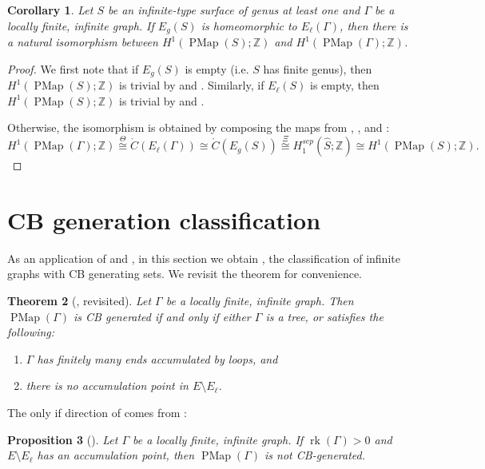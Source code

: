 \documentclass[11pt]{amsart}
\theoremstyle{plain}
\newtheorem{THM}{Theorem}[section]
\newtheorem{PROP}[THM]{Proposition}
\newtheorem{COR}[THM]{Corollary}
\theoremstyle{definition}
\DeclareMathOperator{\PMap}{PMap}
\DeclareMathOperator{\rk}{rk}
\newcommand{\Z}{\mathbb{Z}}
\def\G{{\Gamma}}
\newcommand{\<}{\langle}
\renewcommand{\>}{\rangle}
\newcommand{\dC}{\mathring{C}}
\begin{document}
\begin{COR} \label{cor:graphtosurf}
    Let $S$ be an infinite-type surface of genus at least one and $\G$ be a locally finite, infinite graph. If $E_{g}(S)$ is homeomorphic to $E_{\ell}(\G)$, then there is a natural
    isomorphism between $H^{1}(\PMap(S);\Z)$ and $H^{1}(\PMap(\G);\Z)$.
\end{COR}

\begin{proof}
    We first note that if $E_{g}(S)$ is empty (i.e. $S$ has finite genus), then $H^{1}(\PMap(S);\Z)$ is trivial by \cite[Theorem 1]{APV2020} and \cite[Theorem 1.1]{DP2020}. Similarly, if $E_{\ell}(S)$ is empty, then $H^{1}(\PMap(S);\Z)$ is trivial by  and .

    Otherwise, the isomorphism is obtained by composing the maps from , , and :
    \[
    H^1(\PMap(\G);\Z) \overset{\Theta}{\cong} 
    \dC(E_\ell(\G)) \cong \dC(E_g(S)) \overset{\Xi}{\cong} H_1^{sep}(\hat{S};\Z) \cong H^1(\PMap(S);\Z).
    \]
\end{proof}

\section{CB generation classification} \label{sec:CBgen} 
As an application of  and , in this section we obtain , the classification of infinite graphs with CB generating sets. We revisit the theorem for convenience.

\begin{THM}[, revisited] \label{thm:CBgenClassification_revisited}
    Let $\G$ be a locally finite, infinite graph. Then $\PMap(\G)$ is CB generated if and only if either $\G$ is a tree, or satisfies the following:
    \begin{enumerate}
        \item $\G$ has finitely many ends accumulated by loops, and
        \item there is no accumulation point in $E \setminus E_\ell$.
    \end{enumerate}
\end{THM}

The only if direction of  comes from \cite{DHK2023}:
\begin{PROP}[{\cite[Theorem 6.1]{DHK2023}}]\label{prop:nonCBgenAccumulation}
    Let $\G$ be a locally finite, infinite graph. If $\rk(\G)>0$ and $E \setminus E_\ell$ has an accumulation point, then $\PMap(\G)$ is not CB-generated.
\end{PROP}
\end{document}
